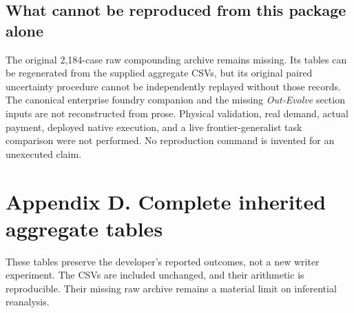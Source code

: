 \subsection*{What cannot be reproduced from this package
alone}\label{what-cannot-be-reproduced-from-this-package-alone}

The original 2,184-case raw compounding archive remains missing. Its
tables can be regenerated from the supplied aggregate CSVs, but its
original paired uncertainty procedure cannot be independently replayed
without those records. The canonical enterprise foundry companion and
the missing \emph{Out-Evolve} section inputs are not reconstructed from
prose. Physical validation, real demand, actual payment, deployed native
execution, and a live frontier-generalist task comparison were not
performed. No reproduction command is invented for an unexecuted claim.

\section*{Appendix D. Complete inherited aggregate
tables}\label{appendix-historical}

These tables preserve the developer's reported outcomes, not a new
writer experiment. The CSVs are included unchanged, and their arithmetic
is reproducible. Their missing raw archive remains a material limit on
inferential reanalysis.


